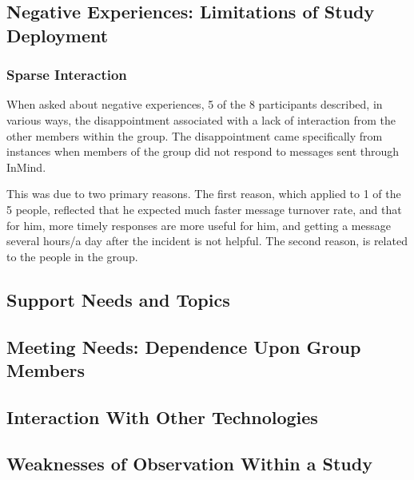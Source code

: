   \subsection{Negative Experiences: Limitations of Study Deployment}
    \subsubsection{Sparse Interaction}
      When asked about negative experiences, 5 of the 8 participants
      described, in various ways, the disappointment associated with
      a lack of interaction from the other members within the group.
      The disappointment came specifically from instances when members of the group
      did not respond to messages sent through InMind.

      This was due to two primary reasons.
      The first reason, which applied to 1 of the 5 people,
      reflected that he expected much faster message turnover rate,
      and that for him,
      more timely responses are more useful for him, and getting a message
      several hours/a day after the incident is not helpful.
      The second reason, is related to the people in the group.

  \subsection{Support Needs and Topics}
  
  \subsection{Meeting Needs: Dependence Upon Group Members}

  \subsection{Interaction With Other Technologies}
  
  \subsection{Weaknesses of Observation Within a Study}

